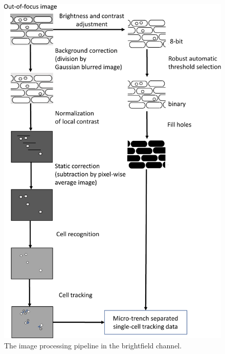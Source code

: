 \documentclass[pdftex,12pt,a4paper]{report}
\begin{document}
\begin{figure}[p]
   \centering
    \includegraphics[height=0.95\textheight]{images/pipeline/01-01.pdf}
    \caption[The image processing pipeline in the  brightfield channel]{The image processing pipeline in the  brightfield channel.}
\end{figure}
\label{fig:pipeline11}
\end{document}
